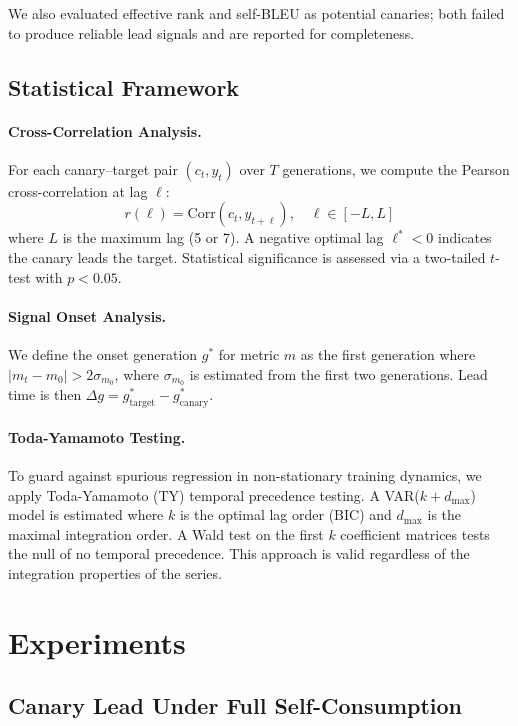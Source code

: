 \documentclass[letterpaper,11pt]{article}
\begin{document}
We also evaluated effective rank and self-BLEU as potential canaries; both failed to produce reliable lead signals and are reported for completeness.

\subsection{Statistical Framework}

\paragraph{Cross-Correlation Analysis.}
For each canary--target pair $(c_t, y_t)$ over $T$ generations, we compute the Pearson cross-correlation at lag $\ell$:
\begin{equation}
    r(\ell) = \text{Corr}(c_{t}, y_{t+\ell}), \quad \ell \in [-L, L]
\end{equation}
where $L$ is the maximum lag (5 or 7).
A negative optimal lag $\ell^* < 0$ indicates the canary leads the target.
Statistical significance is assessed via a two-tailed $t$-test with $p < 0.05$.

\paragraph{Signal Onset Analysis.}
We define the onset generation $g^*$ for metric $m$ as the first generation where $|m_t - m_0| > 2\sigma_{m_0}$, where $\sigma_{m_0}$ is estimated from the first two generations.
Lead time is then $\Delta g = g^*_{\text{target}} - g^*_{\text{canary}}$.

\paragraph{Toda-Yamamoto Testing.}
To guard against spurious regression in non-stationary training dynamics, we apply Toda-Yamamoto (TY) temporal precedence testing.
A VAR($k+d_{\max}$) model is estimated where $k$ is the optimal lag order (BIC) and $d_{\max}$ is the maximal integration order.
A Wald test on the first $k$ coefficient matrices tests the null of no temporal precedence.
This approach is valid regardless of the integration properties of the series.

\section{Experiments}

\subsection{Canary Lead Under Full Self-Consumption}
\label{sec:mvp}
\end{document}
